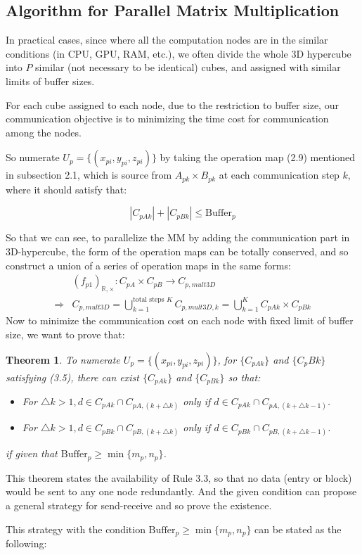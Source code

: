 \documentclass{amsart}
\newtheorem{theorem}{Theorem}[section]
\theoremstyle{definition}
\theoremstyle{remark}
\numberwithin{equation}{section}
\begin{document}
\subsection{Algorithm for Parallel Matrix Multiplication}
	In practical cases, since where all the computation nodes are in the similar conditions (in CPU, GPU, RAM, etc.), we often divide the whole 3D hypercube into $P$ similar (not necessary to be identical) cubes, and assigned with similar limits of buffer sizes.\par
	For each cube assigned to each node, due to the restriction to buffer size, our communication objective is to minimizing the time cost for communication among the nodes.\par
	So numerate $U_p=\{(x_{pi},y_{pi},z_{pi})\}$ by taking the operation map (2.9) mentioned in subsection 2.1, which is source from $A_{pk}\times B_{pk}$ at each communication step $k$, where it should satisfy that:\par
\begin{equation}
|C_{pAk}|+|C_{pBk}|\le \text{Buffer}_p
\end{equation}
\par
	So that we can see, to parallelize the MM by adding the communication part in 3D-hypercube, the form of the operation maps can be totally conserved, and so construct a union of a series of operation maps in the same forms:
\begin{equation}
\begin{array}{ll}
&(f_{p1})_{\mathbb{R},\times}:C_{pA}\times C_{pB}\to C_{p,mult3D}\\
\Longrightarrow &
C_{p,mult3D}=\bigcup_{k=1}^{\text{total steps }K}C_{p,mult3D,k}=\bigcup_{k=1}^{K}C_{pAk}\times C_{pBk}
\end{array}
\end{equation}
Now to minimize the communication cost on each node with fixed limit of buffer size, we want to prove that:\par
\begin{theorem}
To numerate $U_p=\{(x_{pi},y_{pi},z_{pi})\}$, for $\{C_{pAk}\}$ and $\{{C_pBk}\}$ satisfying (3.5), there can exist $\{{C_{pAk}}\}$ and $\{C_{pBk}\}$ so that:
\begin{itemize}
\item For $\bigtriangleup k>1,d\in C_{pAk}\cap C_{pA,(k+\bigtriangleup k)}$ only if $d\in C_{pAk}\cap C_{pA,(k+\bigtriangleup k-1)}$.
\item For $\bigtriangleup k>1,d\in C_{pBk}\cap C_{pB,(k+\bigtriangleup k)}$ only if $d\in C_{pBk}\cap C_{pB,(k+\bigtriangleup k-1)}$.
\end{itemize}
if given that $\text{Buffer}_p\ge \min\{m_p,n_p\}$.
\end{theorem}
\par
	This theorem states the availability of Rule 3.3, so that no data (entry or block) would be sent to any one node redundantly. And the given condition can propose a general strategy for send-receive and so prove the existence.\par
	This strategy with the condition $\text{Buffer}_p\ge \min\{m_p,n_p\}$ can be stated as the following:
\end{document}
